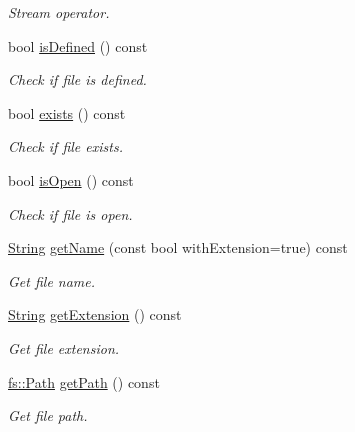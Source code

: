 \begin{DoxyCompactItemize}
\begin{DoxyCompactList}\small\item\em Stream operator. \end{DoxyCompactList}\item 
bool \mbox{\hyperlink{classlibrary_1_1core_1_1fs_1_1_file_a2044eecd956aaf55b4c55872485e1bf9}{is\+Defined}} () const
\begin{DoxyCompactList}\small\item\em Check if file is defined. \end{DoxyCompactList}\item 
bool \mbox{\hyperlink{classlibrary_1_1core_1_1fs_1_1_file_a61851886b6bf66cd0f179b6c7bd7f972}{exists}} () const
\begin{DoxyCompactList}\small\item\em Check if file exists. \end{DoxyCompactList}\item 
bool \mbox{\hyperlink{classlibrary_1_1core_1_1fs_1_1_file_a838cd36a7f54aaff75859b69cc9dac40}{is\+Open}} () const
\begin{DoxyCompactList}\small\item\em Check if file is open. \end{DoxyCompactList}\item 
\mbox{\hyperlink{classlibrary_1_1core_1_1types_1_1_string}{String}} \mbox{\hyperlink{classlibrary_1_1core_1_1fs_1_1_file_a118f4405fec3786d22937e6a77a0cecc}{get\+Name}} (const bool with\+Extension=true) const
\begin{DoxyCompactList}\small\item\em Get file name. \end{DoxyCompactList}\item 
\mbox{\hyperlink{classlibrary_1_1core_1_1types_1_1_string}{String}} \mbox{\hyperlink{classlibrary_1_1core_1_1fs_1_1_file_acfb85ab6934afc65ecf53a1a08775f84}{get\+Extension}} () const
\begin{DoxyCompactList}\small\item\em Get file extension. \end{DoxyCompactList}\item 
\mbox{\hyperlink{classlibrary_1_1core_1_1fs_1_1_path}{fs\+::\+Path}} \mbox{\hyperlink{classlibrary_1_1core_1_1fs_1_1_file_a70b1380ff844adf37a481bbdb46d11a0}{get\+Path}} () const
\begin{DoxyCompactList}\small\item\em Get file path. \end{DoxyCompactList}\item 

\end{DoxyCompactItemize}

